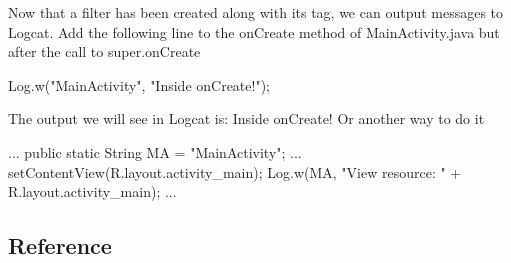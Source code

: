 \documentclass{report}
\begin{document}
\begin{itemize}
             \bigbreak \noindent 
             Now that a filter has been created along with its tag, we can output messages to Logcat.
             \bigbreak \noindent 
             Add the following line to the onCreate method of MainActivity.java but after the call to super.onCreate
             \bigbreak \noindent 
             \begin{javacode}
                 Log.w("MainActivity", "Inside onCreate!");
             \end{javacode}
             \bigbreak \noindent 
             The output we will see in Logcat is: Inside onCreate!
             \bigbreak \noindent 
             Or another way to do it
             \bigbreak \noindent 
             \begin{javacode}
                 ...
                 public static String MA = "MainActivity";
                 ...
                 setContentView(R.layout.activity_main);
                 Log.w(MA, "View resource: " +
                 R.layout.activity_main);
                 ... 
             \end{javacode}
    \end{itemize}

    \pagebreak 
    \subsection{Reference}
    \bigbreak \noindent 
\end{document}
